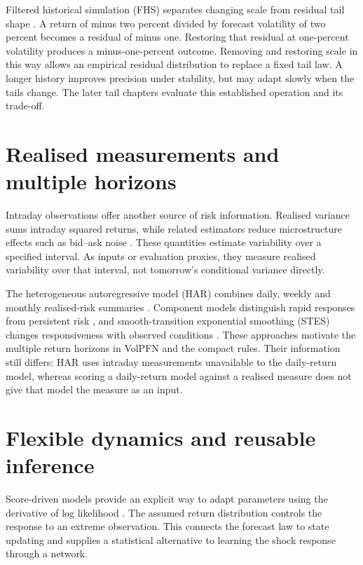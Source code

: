 Filtered historical simulation (FHS) separates changing scale from residual tail shape \citep{baroneadesi1999var}. A return of minus two percent divided by forecast volatility of two percent becomes a residual of minus one. Restoring that residual at one-percent volatility produces a minus-one-percent outcome. Removing and restoring scale in this way allows an empirical residual distribution to replace a fixed tail law. A longer history improves precision under stability, but may adapt slowly when the tails change. The later tail chapters evaluate this established operation and its trade-off.

\section{Realised measurements and multiple horizons}

Intraday observations offer another source of risk information. Realised variance sums intraday squared returns, while related estimators reduce microstructure effects such as bid--ask noise \citep{andersen2003modeling}. These quantities estimate variability over a specified interval. As inputs or evaluation proxies, they measure realised variability over that interval, not tomorrow's conditional variance directly.

The heterogeneous autoregressive model (HAR) combines daily, weekly and monthly realised-risk summaries \citep{corsi2009simple}. Component models distinguish rapid responses from persistent risk \citep{engle1999permanent}, and smooth-transition exponential smoothing (STES) changes responsiveness with observed conditions \citep{taylor2004smooth}. These approaches motivate the multiple return horizons in VolPFN and the compact rules. Their information still differs: HAR uses intraday measurements unavailable to the daily-return model, whereas scoring a daily-return model against a realised measure does not give that model the measure as an input.

\section{Flexible dynamics and reusable inference}

Score-driven models provide an explicit way to adapt parameters using the derivative of log likelihood \citep{creal2013generalized,harvey2013dynamic}. The assumed return distribution controls the response to an extreme observation. This connects the forecast law to state updating and supplies a statistical alternative to learning the shock response through a network.

